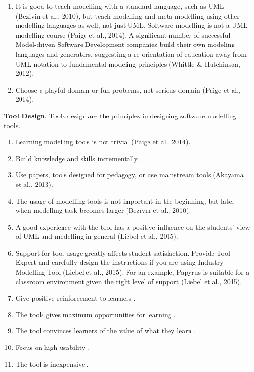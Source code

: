 \documentclass[a4paper]{Report}
\begin{document}
\begin{enumerate}
\item It is good to teach modelling with a standard language, such as UML (Bezivin et al., 2010), but teach modelling and meta-modelling using other modelling languages as well, not just UML. Software modelling is not a UML modelling course (Paige et al., 2014). A significant number of successful Model-driven Software Development companies build their own modeling languages and generators, suggesting a re-orientation of education away from UML notation to fundamental modeling principles (Whittle \& Hutchinson, 2012).
\item Choose a playful domain or fun problems, not serious domain (Paige et al., 2014).
\end{enumerate}


\textbf{Tool Design}. Tools design are the principles in designing software modelling tools.
\begin{enumerate}
\item Learning modelling tools is not trivial (Paige et al., 2014). 
\item Build knowledge and skills incrementally \cite{lethbridge2014teaching}.
\item Use papers, tools designed for pedagogy, or use mainstream tools (Akayama et al., 2013).
\item The usage of modelling tools is not important in the beginning, but later when modelling task becomes larger (Bezivin et al., 2010).
\item A good experience with the tool has a positive inﬂuence on the students’ view of UML and modelling in general (Liebel et al., 2015).
\item Support for tool usage greatly affects student satisfaction. Provide Tool Expert and carefully design the instructions if you are using Industry Modelling Tool (Liebel et al., 2015). For an example, Papyrus is suitable for a classroom environment given the right level of support (Liebel et al., 2015).
\item Give positive reinforcement to learners \cite{lethbridge2014teaching}.
\item The tools gives maximum opportunities for learning \cite{lethbridge2014teaching}.
\item The tool convinces learners of the value of what they learn \cite{lethbridge2014teaching}.
\item Focus on high usability \cite{lethbridge2014teaching}.
\item The tool is inexpensive \cite{lethbridge2014teaching}.
\end{enumerate}
\end{document}
